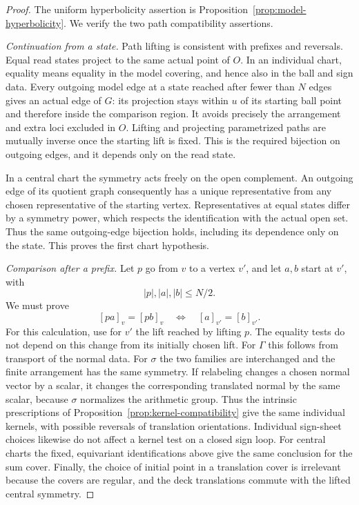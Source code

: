 \begin{proof}
The uniform hyperbolicity assertion is
Proposition~\ref{prop:model-hyperbolicity}.  We verify the two path
compatibility assertions.

\emph{Continuation from a state.}
Path lifting is consistent with prefixes and reversals.  Equal read
states project to the same actual point of $O$.  In an individual
chart, equality means equality in the model covering, and hence also
in the ball and sign data.  Every outgoing model edge at a state
reached after fewer than $N$ edges gives an actual edge of $G$: its
projection stays within $u$ of its starting ball point and therefore
inside the comparison region.  It avoids precisely the arrangement
and extra loci excluded in $O$.  Lifting and projecting parametrized
paths are mutually inverse once the starting lift is fixed.  This is
the required bijection on outgoing edges, and it depends only on the
read state.

In a central chart the symmetry acts freely on the open complement.
An outgoing edge of its quotient graph consequently has a unique
representative from any chosen representative of the starting
vertex.  Representatives at equal states differ by a symmetry power,
which respects the identification with the actual open set.  Thus the
same outgoing-edge bijection holds, including its dependence only on
the state.  This proves the first chart hypothesis.

\emph{Comparison after a prefix.}
Let $p$ go from $v$ to a vertex $v'$, and let $a,b$ start at $v'$,
with
\[
 |p|,|a|,|b|\le N/2.
\]
We must prove
\begin{equation}\label{app:prefix-compatibility}
 [pa]_v=[pb]_v\quad\Longleftrightarrow\quad[a]_{v'}=[b]_{v'}.
\end{equation}
For this calculation, use for $v'$ the lift reached by lifting $p$.
The equality tests do not depend on this change from its initially
chosen lift.  For $\Gamma$ this follows from transport of the normal
data.  For $\sigma$ the two families are interchanged and the finite
arrangement has the same symmetry.  If relabeling changes a chosen
normal vector by a scalar, it changes the corresponding translated
normal by the same scalar, because $\sigma$ normalizes the
arithmetic group.  Thus the intrinsic prescriptions of
Proposition~\ref{prop:kernel-compatibility} give the same individual
kernels, with possible reversals of translation orientations.
Individual sign-sheet choices likewise do not affect a kernel test
on a closed sign loop.  For central charts the fixed, equivariant
identifications above give the same conclusion for the sum cover.
Finally, the choice of initial point in a translation cover is
irrelevant because the covers are regular, and the deck translations
commute with the lifted central symmetry.


\end{proof}

